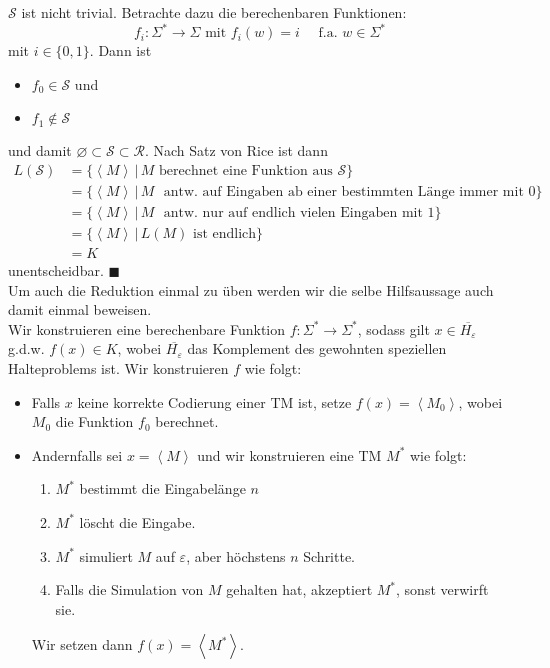 \documentclass[11pt,a4paper]{article}
\newcommand{\qedb}{\hfill\(\blacksquare\)}
\let\emptyset\varnothing
\begin{document}
\( \mathcal{S} \) ist nicht trivial. Betrachte dazu die berechenbaren Funktionen:
\[
	f_i: \Sigma^\ast \to \Sigma \text{ mit } f_i(w) = i \quad\text{ f.a. } w \in \Sigma^\ast
\]
mit \( i \in \{ 0, 1 \} \). Dann ist
\begin{itemize}
	\item \( f_0 \in \mathcal{S} \) und
	\item \( f_1 \notin \mathcal{S} \)
\end{itemize}
und damit \( \emptyset \subset \mathcal{S} \subset \mathcal{R} \). Nach Satz von Rice ist dann
\begin{align*}
	L(\mathcal{S}) &= \{ \left\langle M \right\rangle \,\vert\, M \text{ berechnet eine Funktion aus } \mathcal{S} \}\\
		&= \{ \left\langle M \right\rangle \,\vert\, M \text{ {antw.} auf Eingaben ab einer bestimmten L\"ange immer mit } 0 \}\\
		&= \{ \left\langle M \right\rangle \,\vert\, M \text{ {antw.} nur auf endlich vielen Eingaben mit } 1 \}\\
		&= \{ \left\langle M \right\rangle \,\vert\, L(M) \text{ ist endlich} \}\\
		&= K
\end{align*}
unentscheidbar. \qedb\\[2em]
Um auch die Reduktion einmal zu \"uben werden wir die selbe Hilfsaussage auch damit einmal beweisen.\\
Wir konstruieren eine berechenbare Funktion \( f: \Sigma^\ast \to \Sigma^\ast \), sodass gilt \( x \in \overline{H_\varepsilon} \) {g.d.w.} \( f(x) \in K \), wobei \( \overline{H_\varepsilon} \) das Komplement des gewohnten speziellen Halteproblems ist. Wir konstruieren \( f \) wie folgt:
\begin{itemize}
	\item Falls \( x \) keine korrekte Codierung einer TM ist, setze \( f(x) = \left\langle M_0 \right\rangle \), wobei \( M_0 \) die Funktion \( f_0 \) berechnet.
	\item Andernfalls sei \( x = \left\langle M \right\rangle \) und wir konstruieren eine TM \( M^\ast \) wie folgt:
		\begin{enumerate}
			\item \( M^\ast \) bestimmt die Eingabel\"ange \( n \)
			\item \( M^\ast \) l\"oscht die Eingabe.
			\item \( M^\ast \) simuliert \( M \) auf \( \varepsilon \), aber h\"ochstens \( n \) Schritte.
			\item Falls die Simulation von \( M \) gehalten hat, akzeptiert \( M^\ast \), sonst verwirft sie.
		\end{enumerate}
		Wir setzen dann \( f(x) = \left\langle M^\ast \right\rangle \).
\end{itemize}
\end{document}
